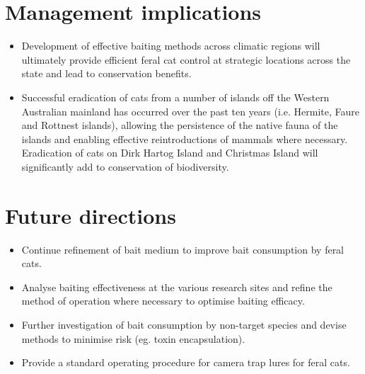 \documentclass[version=last, 
    paper=a4, %
    10pt, %
    usenames,
    dvipsnames, 
    oneside, %
    headings=openany, %
    DIV=15 %
]{scrbook}
\begin{document}
\section*{Management implications}
\begin{itemize}
\itemsep1pt\parskip0pt
\item
  Development of effective baiting methods across climatic regions will
  ultimately provide efficient feral cat control at strategic locations
  across the state and lead to conservation benefits.
\item
  Successful eradication of cats from a number of islands off the
  Western Australian mainland has occurred over the past ten years (i.e.
  Hermite, Faure and Rottnest islands), allowing the persistence of the
  native fauna of the islands and enabling effective reintroductions of
  mammals where necessary. Eradication of cats on Dirk Hartog Island and
  Christmas Island will significantly add to conservation of
  biodiversity.
\end{itemize}



\section*{Future directions}
\begin{itemize}
\itemsep1pt\parskip0pt
\item
  Continue refinement of bait medium to improve bait consumption by
  feral cats.
\item
  Analyse baiting effectiveness at the various research sites and refine
  the method of operation where necessary to optimise baiting efficacy.
\item
  Further investigation of bait consumption by non-target species and
  devise methods to minimise risk (eg. toxin encapsulation).
\item
  Provide a standard operating procedure for camera trap lures for feral
  cats.
\end{itemize}



\end{document}
